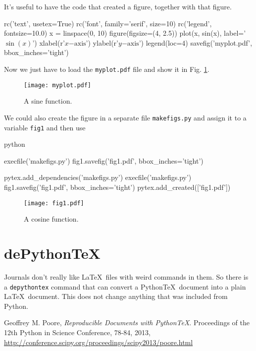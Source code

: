 \documentclass{aa}
\begin{document}
    It's useful to have the code that created a figure, together with that figure.

\begin{pylabblock}
rc('text', usetex=True)
rc('font', family='serif', size=10)
rc('legend', fontsize=10.0)
x = linspace(0, 10)
figure(figsize=(4, 2.5))
plot(x, sin(x), label='$\sin(x)$')
xlabel(r'$x\mathrm{-axis}$')
ylabel(r'$y\mathrm{-axis}$')
legend(loc=4)
savefig('myplot.pdf', bbox_inches='tight')
\end{pylabblock}

    Now we just have to load the \texttt{myplot.pdf} file and show it in Fig. \ref{fig:sine}.
    
    \begin{figure}
    \centering
    \texttt{[image: myplot.pdf]}
      \caption{A sine function.}
      \label{fig:sine}
    \end{figure}

    We could also create the figure in a separate file \texttt{makefigs.py} and assign it to a variable \texttt{fig1} and then use

\begin{pygments}{python}
\begin{pylabcode}
execfile('makefigs.py')
fig1.savefig('fig1.pdf', bbox_inches='tight')
\end{pylabcode}
\end{pygments}

\begin{pylabcode}
pytex.add_dependencies('makefigs.py')
execfile('makefigs.py')
fig1.savefig('fig1.pdf', bbox_inches='tight')
pytex.add_created(['fig1.pdf'])
\end{pylabcode}


    \begin{figure}
    \centering
    \texttt{[image: fig1.pdf]}
      \caption{A cosine function.}
      \label{fig:cosine}
    \end{figure}

\section{dePython\TeX}

  Journals don't really like \LaTeX\ files with weird commands in them. So there is a {\tt depythontex} command that can convert a Python\TeX\ document into a plain \LaTeX\ document. This does not change anything that was included from Python.




\begin{thebibliography}{}

  Geoffrey M. Poore,
  \emph{Reproducible Documents with PythonTeX}.
  Proceedings of the 12th Python in Science Conference, 78-84, 2013,
  \href{http://conference.scipy.org/proceedings/scipy2013/poore.html}{http://conference.scipy.org/proceedings/scipy2013/poore.html}

\end{thebibliography}
\end{document}
